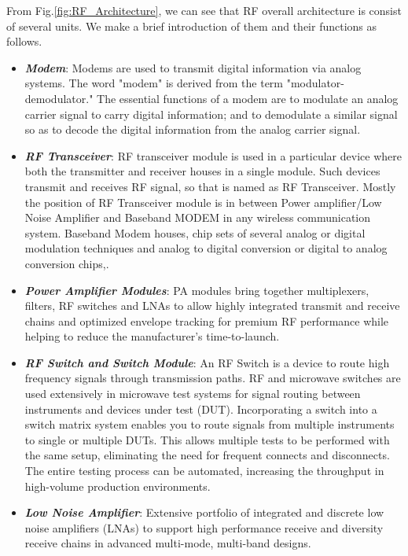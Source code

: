 \documentclass[conference]{IEEEtran}
\begin{document}
From Fig.\ref{fig:RF_Architecture}, we can see that RF overall architecture is consist of several units. We make a brief introduction of them and their functions as follows.
\begin{itemize}
	\item {\bfseries{\emph{Modem}}}: Modems are used to transmit digital information via analog systems. The word "modem" is derived from the term "modulator-demodulator." The essential functions of a modem are to modulate an analog carrier signal to carry digital information; and to demodulate a similar signal so as to decode the digital information from the analog carrier signal\cite{7334868}.
	
	\item {\bfseries{\emph{RF Transceiver}}}: RF transceiver module is used in a particular device where both the transmitter and receiver houses in a single module. Such devices transmit and receives RF signal, so that is named as RF Transceiver. Mostly the position of RF Transceiver module is in between Power amplifier/Low Noise Amplifier and Baseband MODEM in any wireless communication system. Baseband Modem houses, chip sets of several analog or digital modulation techniques and analog to digital conversion or digital to analog conversion chips\cite{6756237},\cite{Exefx.org}.
	
	\item {\bfseries{\emph{Power Amplifier Modules}}}: PA modules bring together multiplexers, filters, RF switches and LNAs to allow highly integrated transmit and receive chains and optimized envelope tracking for premium RF performance while helping to reduce the manufacturer’s time-to-launch\cite{Qualcomm.org}.
	
	\item {\bfseries{\emph{RF Switch and Switch Module}}}: An RF Switch is a device to route high frequency signals through transmission paths. RF and microwave switches are used extensively in microwave test systems for signal routing between instruments and devices under test (DUT)\cite{RFwikipedia.org}. Incorporating a switch into a switch matrix system enables you to route signals from multiple instruments to single or multiple DUTs. This allows multiple tests to be performed with the same setup, eliminating the need for frequent connects and disconnects. The entire testing process can be automated, increasing the throughput in high-volume production environments\cite{DBLP:journals/corr/Truman16}.
	
	\item {\bfseries{\emph{Low Noise Amplifier}}}: Extensive portfolio of integrated and discrete low noise amplifiers (LNAs) to support high performance receive and diversity receive chains in advanced multi-mode, multi-band designs\cite{Qualcomm.org}.
		

\end{itemize}
\end{document}
